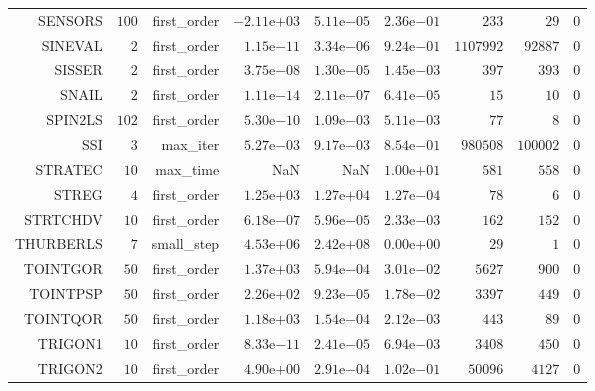\begin{longtable}{rrrrrrrrr}
SENSORS & \(   100\) & first\_order & \(-2.11\)e\(+03\) & \( 5.11\)e\(-05\) & \( 2.36\)e\(-01\) & \(   233\) & \(    29\) & \(     0\) \\
SINEVAL & \(     2\) & first\_order & \( 1.15\)e\(-11\) & \( 3.34\)e\(-06\) & \( 9.24\)e\(-01\) & \(1107992\) & \( 92887\) & \(     0\) \\
SISSER & \(     2\) & first\_order & \( 3.75\)e\(-08\) & \( 1.30\)e\(-05\) & \( 1.45\)e\(-03\) & \(   397\) & \(   393\) & \(     0\) \\
SNAIL & \(     2\) & first\_order & \( 1.11\)e\(-14\) & \( 2.11\)e\(-07\) & \( 6.41\)e\(-05\) & \(    15\) & \(    10\) & \(     0\) \\
SPIN2LS & \(   102\) & first\_order & \( 5.30\)e\(-10\) & \( 1.09\)e\(-03\) & \( 5.11\)e\(-03\) & \(    77\) & \(     8\) & \(     0\) \\
SSI & \(     3\) & max\_iter & \( 5.27\)e\(-03\) & \( 9.17\)e\(-03\) & \( 8.54\)e\(-01\) & \(980508\) & \(100002\) & \(     0\) \\
STRATEC & \(    10\) & max\_time &       NaN &       NaN & \( 1.00\)e\(+01\) & \(   581\) & \(   558\) & \(     0\) \\
STREG & \(     4\) & first\_order & \( 1.25\)e\(+03\) & \( 1.27\)e\(+04\) & \( 1.27\)e\(-04\) & \(    78\) & \(     6\) & \(     0\) \\
STRTCHDV & \(    10\) & first\_order & \( 6.18\)e\(-07\) & \( 5.96\)e\(-05\) & \( 2.33\)e\(-03\) & \(   162\) & \(   152\) & \(     0\) \\
THURBERLS & \(     7\) & small\_step & \( 4.53\)e\(+06\) & \( 2.42\)e\(+08\) & \( 0.00\)e\(+00\) & \(    29\) & \(     1\) & \(     0\) \\
TOINTGOR & \(    50\) & first\_order & \( 1.37\)e\(+03\) & \( 5.94\)e\(-04\) & \( 3.01\)e\(-02\) & \(  5627\) & \(   900\) & \(     0\) \\
TOINTPSP & \(    50\) & first\_order & \( 2.26\)e\(+02\) & \( 9.23\)e\(-05\) & \( 1.78\)e\(-02\) & \(  3397\) & \(   449\) & \(     0\) \\
TOINTQOR & \(    50\) & first\_order & \( 1.18\)e\(+03\) & \( 1.54\)e\(-04\) & \( 2.12\)e\(-03\) & \(   443\) & \(    89\) & \(     0\) \\
TRIGON1 & \(    10\) & first\_order & \( 8.33\)e\(-11\) & \( 2.41\)e\(-05\) & \( 6.94\)e\(-03\) & \(  3408\) & \(   450\) & \(     0\) \\
TRIGON2 & \(    10\) & first\_order & \( 4.90\)e\(+00\) & \( 2.91\)e\(-04\) & \( 1.02\)e\(-01\) & \( 50096\) & \(  4127\) & \(     0\) \\

\end{longtable}
